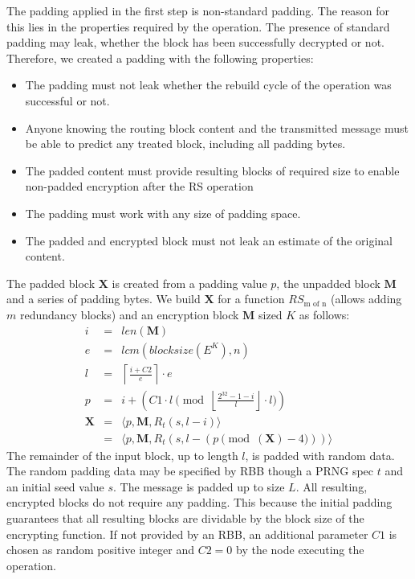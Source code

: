 The padding applied in the first step is non-standard padding. The reason for this lies in the properties required by the operation. The presence of standard padding may leak, whether the block has been successfully decrypted or not. Therefore, we created a padding with the following properties:
\begin{itemize}
	\item The padding must not leak whether the rebuild cycle of the operation was successful or not.
	\item Anyone knowing the routing block content and the transmitted message must be able to predict any treated block, including all padding bytes.
	\item The padded content must provide resulting blocks of required size to enable non-padded encryption after the RS operation
	\item The padding must work with any size of padding space.
	\item The padded and encrypted block must not leak an estimate of the original content.
\end{itemize}

The padded block $\mathbf{X}$ is created from a padding value $p$, the unpadded block $\mathbf{M}$ and a series of padding bytes. We build $\mathbf{X}$ for a function $RS_{\text{m of n}}$ (allows adding $m$ redundancy blocks) and an encryption block $\mathbf{M}$ sized $K$ as follows:
\begin{eqnarray}
i          & = & len(\mathbf{M}) \label{eqn:sizeOrigMsg}\\
e          & = & lcm\left(blocksize\left(E^{K}\right), n\right) \label{eqn:sizeOfOpBlock}\\
l          & = & \left\lceil\frac{i + C2 }{e}\right\rceil\cdot e \label{eqn:sizeOfPaddedBlock}\\
p          & = & i + \left( C1 \cdot l \pmod{\left\lfloor\frac{2^{32}-1-i}{l}\right\rfloor\cdot l}\right)\\
\mathbf{X} & = & \langle p,\mathbf{M},R_{t}\left(s,l-i\right)\rangle\\\nonumber
           & = & \langle p,\mathbf{M},R_{t}\left(s,l-\left(p \pmod{\left(\mathbf{X}\right)-4}\right)\right)\rangle
\end{eqnarray}    
The remainder of the input block, up to length $l$, is padded with random data. The random padding data may be specified by RBB though a PRNG spec $t$ and an initial seed value $s$. The message is padded up to size $L$. All resulting, encrypted blocks do not require any padding. This because the initial padding guarantees that all resulting blocks are dividable by the block size of the encrypting function. If not provided by an RBB, an additional parameter $C1$ is chosen as random positive integer and $C2=0$  by the node executing the operation.


